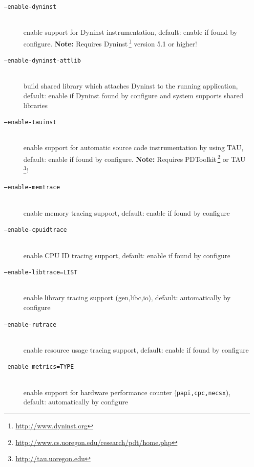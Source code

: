 \documentclass[a4paper,twoside,12pt,BCOR12mm]{scrbook}
\begin{document}
\begin{latexonly}
\begin{description}
\item[\texttt{--enable-dyninst}] ~\\
                              enable support for Dyninst instrumentation,
                              default: enable if found by configure.
                              \textbf{Note:} Requires Dyninst\,\footnote{\url{http://www.dyninst.org}}   version 5.1 or higher!

\item[\texttt{--enable-dyninst-attlib}] ~\\
                              build shared library which attaches Dyninst to 
                              the running application,
                              default: enable if Dyninst found
                              by configure and system supports shared libraries

\item[\texttt{--enable-tauinst}] ~\\
                              enable support for automatic source code
                              instrumentation by using TAU, default: enable if
                              found by configure.
                              \textbf{Note:} Requires PDToolkit\,\footnote{\url{http://www.cs.uoregon.edu/research/pdt/home.php}} or TAU\,\footnote{\url{http://tau.uoregon.edu}}!

\item[\texttt{--enable-memtrace}] ~\\
                              enable memory tracing support, default: enable if
                              found by configure

\item[\texttt{--enable-cpuidtrace}] ~\\
                              enable CPU ID tracing support, default: enable if
                              found by configure

\item[\texttt{--enable-libtrace=LIST}] ~\\
                              enable library tracing support (gen,libc,io),
                              default: automatically by configure

\item[\texttt{--enable-rutrace}] ~\\
                              enable resource usage tracing support, default:
                              enable if found by configure

\item[\texttt{--enable-metrics=TYPE}] ~\\
                              enable support for hardware performance counter
                              (\texttt{papi,cpc,necsx}), default: automatically
                              by configure


\end{description}
\end{latexonly}
\end{document}

